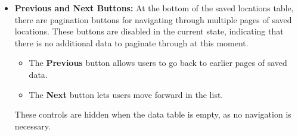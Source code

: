 \begin{itemize}
    \item{} \textbf{Previous and Next Buttons:} At the bottom of the saved locations table, there are pagination buttons for navigating through multiple pages of saved locations. These buttons are disabled in the current state, indicating that there is no additional data to paginate through at this moment.
    \begin{itemize}
        \item{} The \textbf{Previous} button allows users to go back to earlier pages of saved data.
        \item{} The \textbf{Next} button lets users move forward in the list.
    \end{itemize}
    These controls are hidden when the data table is empty, as no navigation is necessary.
\end{itemize}

